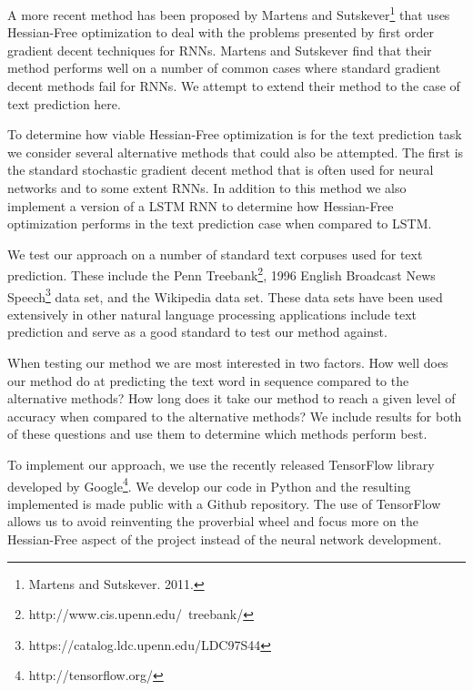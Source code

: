 \documentclass{article}
\begin{document}
A more recent method has been proposed by Martens and Sutskever\footnote{Martens and Sutskever. 2011.} that uses Hessian-Free optimization to deal with the problems presented by first order gradient decent techniques for RNNs. Martens and Sutskever find that their method performs well on a number of common cases where standard gradient decent methods fail for RNNs.  We attempt to extend their method to the case of text prediction here.

To determine how viable Hessian-Free optimization is for the text prediction task we consider several alternative methods that could also be attempted.  The first is the standard stochastic gradient decent method that is often used for neural networks and to some extent RNNs.  In addition to this method we also implement a version of a LSTM RNN to determine how Hessian-Free optimization performs in the text prediction case when compared to LSTM.

We test our approach on a number of standard text corpuses used for text prediction.  These include the Penn Treebank\footnote{http://www.cis.upenn.edu/~treebank/}, 1996 English Broadcast News Speech\footnote{https://catalog.ldc.upenn.edu/LDC97S44} data set, and the Wikipedia data set.  These data sets have been used extensively in other natural language processing applications include text prediction and serve as a good standard to test our method against.

When testing our method we are most interested in two factors.  How well does our method do at predicting the text word in sequence compared to the alternative methods?  How long does it take our method to reach a given level of accuracy when compared to the alternative methods?  We include results for both of these questions and use them to determine which methods perform best.

To implement our approach, we use the recently released TensorFlow library developed by Google\footnote{http://tensorflow.org/}.  We develop our code in Python and the resulting implemented is made public with a Github repository.  The use of TensorFlow allows us to avoid reinventing the proverbial wheel and focus more on the Hessian-Free aspect of the project instead of the neural network development.
\end{document}
